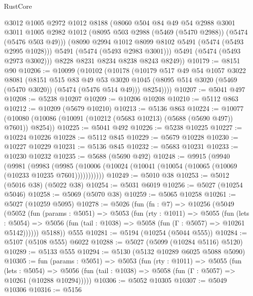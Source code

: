 \begin{lexlean}{RustCore}
\begin{coremodule}
          @3012
          @1005
          @2972
          @1012
          @8188
          (@8060
            @504
            @84
            @49
            @54
            @2988
            @3001
            @3011
            @1005
            @2982
            @1012
            (@8095 @503 @2988 (@5469 (@5470 @2988)) (@5474 (@5476 @503 @49)))
            (@8090 @2994 @1012 @8099 @8102 @5491 (@5474 (@5493 @2995 @1028)))
            @5491
            (@5474 (@5493 @2983 @3001)))
          @5491
          (@5474 (@5493 @2973 @3002)))
        @8228
        @8231
        @8234
        @8238
        @8243
        @8249))
@10179 := @8151 @90
@10206 := @10099
    (@10102
      (@10178
        (@10179
          @517
          @49
          @54
          @1057
          @3022
          @8081
          (@8151
            @515
            @83
            @49
            @53
            @3020
            @1045
            (@8095 @514 @3020 (@5469 (@5470 @3020)) (@5474 (@5476 @514 @49)))
            @8254))))
@10207 := @5041 @497
@10208 := @5238 @10207
@10209 := @10206 @10208
@10210 := @5112 @863
@10212 := @10209 (@5679 @10210)
@10213 := @5136 @863
@10224 := @10077 (@10080 (@10086 (@10091 (@10212 (@5683 @10213) (@5688 (@5690 @497)) @7601)) @8254))
@10225 := @5041 @492
@10226 := @5238 @10225
@10227 := @10224 @10226
@10228 := @5112 @845
@10229 := @5679 @10228
@10230 := @10227 @10229
@10231 := @5136 @845
@10232 := @5683 @10231
@10233 := @10230 @10232
@10235 := @5688 (@5690 @492)
@10248 := @9915
    (@9940
      (@9981
        (@9983
          (@9985 (@10006 (@10024 (@10041 (@10054 (@10065 (@10069 (@10233 @10235 @7601)))))))))))
@10249 := @5010 @38
@10253 := @5012 (@5016 @38) (@5022 @38)
@10254 := @5031 @6019
@10256 := @5027 (@10254 @5046)
@10258 := @5069 (@5070 @38)
@10259 := @5065 @10258
@10261 := @5027 (@10259 @5095)
@10278 := @5026
    (fun (fn : @7) =>
    @10256
      (@5049
        (@5052
          (fun (params : @5051) =>
          @5053
            (fun (rty : @1011) =>
            @5055
              (fun (lets : @5054) =>
              @5056 (fun (tail : @1038) => @5058 (fun (Γ : @5057) => @10261 @5142))))))
        @5188))
    @555
@10281 := @5194 (@10254 (@5044 @555))
@10284 := @5107 (@5108 @555) @6022
@10288 := @5027 (@5099 (@10284 @5116) @5120)
@10289 := @5133 @555
@10294 := @5130 (@5132 @10289 @6025 @5088 @5090)
@10305 := fun (params : @5051) =>
  @5053
    (fun (rty : @1011) =>
    @5055
      (fun (lets : @5054) =>
      @5056 (fun (tail : @1038) => @5058 (fun (Γ : @5057) => @10261 (@10288 @10294)))))
@10306 := @5052 @10305
@10307 := @5049 @10306
@10316 := @5156

\end{coremodule}
\end{lexlean}
